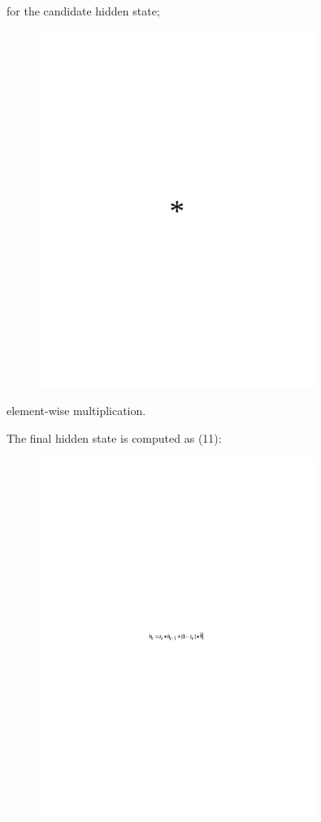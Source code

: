 for the candidate hidden state;
\begin{figure}[H]
	\centering
	\includegraphics[width=0.8\textwidth]{media/ict/image75}
	\caption*{}
\end{figure}

element-wise multiplication.

The final hidden state is computed as (11):

\begin{figure}[H]
	\centering
	\includegraphics[width=0.8\textwidth]{media/ict/image76}
	\caption*{}
\end{figure}


